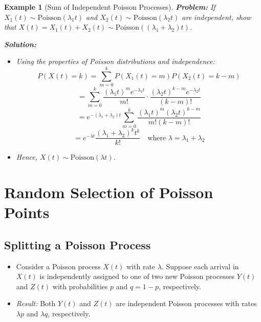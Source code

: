 \documentclass[12pt]{article}
\newtheorem{example}{Example}
\begin{document}
\begin{example}[Sum of Independent Poisson Processes]
    \textbf{Problem:} If \( X_1(t) \sim \text{Poisson}(\lambda_1 t) \) and \( X_2(t) \sim \text{Poisson}(\lambda_2 t) \) are independent, show that \( X(t) = X_1(t) + X_2(t) \sim \text{Poisson}((\lambda_1 + \lambda_2) t) \).
    
    \textbf{Solution:}
    \begin{itemize}
        \item Using the properties of Poisson distributions and independence:
        \[
        P(X(t) = k) = \sum_{m=0}^{k} P(X_1(t) = m) P(X_2(t) = k - m)
        \]
        \[
        = \sum_{m=0}^{k} \frac{(\lambda_1 t)^m e^{-\lambda_1 t}}{m!} \cdot \frac{(\lambda_2 t)^{k - m} e^{-\lambda_2 t}}{(k - m)!}
        \]
        \[
        = e^{-(\lambda_1 + \lambda_2)t} \sum_{m=0}^{k} \frac{(\lambda_1 t)^m (\lambda_2 t)^{k - m}}{m! (k - m)!}
        \]
        \[
        = e^{-\lambda t} \frac{(\lambda_1 + \lambda_2)^k t^k}{k!} \quad \text{where } \lambda = \lambda_1 + \lambda_2
        \]
        \item Hence, \( X(t) \sim \text{Poisson}(\lambda t) \).
    \end{itemize}
\end{example}

\section{Random Selection of Poisson Points}

\subsection{Splitting a Poisson Process}
\begin{itemize}
    \item Consider a Poisson process \( X(t) \) with rate \( \lambda \). Suppose each arrival in \( X(t) \) is independently assigned to one of two new Poisson processes \( Y(t) \) and \( Z(t) \) with probabilities \( p \) and \( q = 1 - p \), respectively.
    \item \textit{Result:} Both \( Y(t) \) and \( Z(t) \) are independent Poisson processes with rates \( \lambda p \) and \( \lambda q \), respectively.
\end{itemize}
\end{document}
